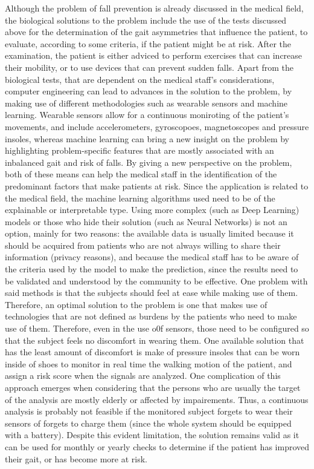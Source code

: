 Although the problem of fall prevention is already discussed in the medical field, the biological solutions to the problem include the use of the tests discussed above for the determination of the gait asymmetries 
that influence the patient, to evaluate, according to some criteria, if the patient might be at risk. After the examination, the patient is either adviced to perform exercises that can increase their mobility, or to use devices that can prevent sudden falls.
Apart from the biological tests, that are dependent on the medical staff's considerations, computer engineering can lead to advances in the solution to the problem, by making use of different methodologies such as wearable sensors and machine learning. 
Wearable sensors allow for a continuous moniroting of the patient's movements, and include accelerometers, gyroscopoes, magnetoscopes and pressure insoles, whereas machine learning can bring a new insight on the problem by highlighting problem-specific features
that are mostly associated with an inbalanced gait and risk of falls. By giving a new perspective on the problem, both of these means can help the medical staff in the identification of the predominant factors that make patients at risk.
Since the application is related to the medical field, the machine learning algorithms used need to be of the explainable or interpretable type. Using more complex (such as Deep Learning) models or those who hide their solution (such as Neural Networks) is not an option, mainly for two reasons:
the available data is usually limited because it should be acquired from patients who are not always willing to share their information (privacy reasons), and because the medical staff has to be aware of the criteria used by the model to make the prediction, since the results need to be validated and understood by the community to be effective.
One problem with said methods is that the subjects should feel at ease while making use of them. Therefore, an optimal solution to the problem is one that makes use of technologies that are not defined as burdens by the patients who need to make use of them. Therefore, even in the use o0f
sensors, those need to be configured so that the subject feels no discomfort in wearing them. One available solution that has the least amount of discomfort is make of pressure insoles that can be worn inside of shoes to monitor in real time the walking motion of the patient, and assign a risk score
when the signals are analyzed. 
One complication of this approach emerges when considering that the persons who are usually the target of the analysis are mostly elderly or affected by impairements.
Thus, a continuous analysis is probably not feasible if the monitored subject forgets to wear their sensors of forgets to charge them (since the whole system should be equipped with a battery).
Despite this evident limitation, the solution remains valid as it can be used for monthly or yearly checks to determine if the patient has improved their gait, or has become more at risk.
